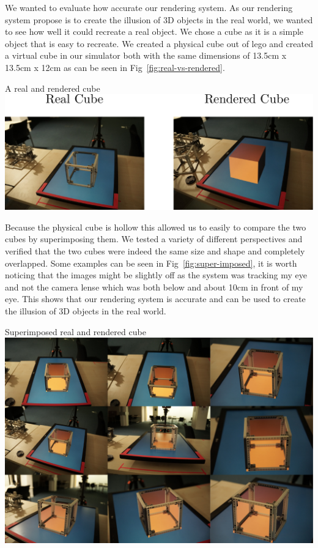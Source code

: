 We wanted to evaluate how accurate our rendering system. As our rendering system propose is to create the illusion of 3D objects in the real world, we wanted to see how well it could recreate a real object. We chose a cube as it is a simple object that is easy to recreate. We created a physical cube out of lego and created a virtual cube in our simulator both with the same dimensions of 13.5cm x 13.5cm x 12cm as can be seen in Fig~\ref{fig:real-vs-rendered}.

\begin{figureBox}[label={fig:real-vs-rendered}, width=1.0\linewidth]{A real and rendered cube}
	\includegraphics[width = 1.0\linewidth]{./evaluation/figures/real-vs-rendered.pdf}
\end{figureBox}

Because the physical cube is hollow this allowed us to easily to compare the two cubes by superimposing them. We tested a variety of different perspectives and verified that the two cubes were indeed the same size and shape and completely overlapped. Some examples can be seen in Fig~\ref{fig:super-imposed}, it is worth noticing that the images might be slightly off as the system was tracking my eye and not the camera lense which was both below and about 10cm in front of my eye. This shows that our rendering system is accurate and can be used to create the illusion of 3D objects in the real world. 

\begin{figureBox}[label={fig:super-imposed}, width=1.0\linewidth]{Superimposed real and rendered cube}
	\includegraphics[width = 1.0\linewidth]{./evaluation/figures/super-imposed.pdf}
\end{figureBox}
